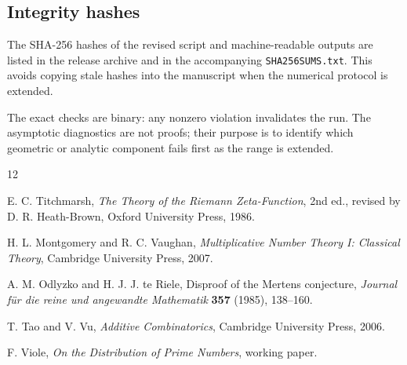 \documentclass[11pt]{article}
\theoremstyle{definition}
\newcommand{\1}{\mathbf{1}}
\begin{document}
\subsection{Integrity hashes}

The SHA-256 hashes of the revised script and machine-readable outputs are listed in the release archive and in the accompanying \texttt{SHA256SUMS.txt}.  This avoids copying stale hashes into the manuscript when the numerical protocol is extended.

The exact checks are binary: any nonzero violation invalidates the run. The asymptotic diagnostics are not proofs; their purpose is to identify which geometric or analytic component fails first as the range is extended.

\begin{thebibliography}{12}

E. C. Titchmarsh,
\emph{The Theory of the Riemann Zeta-Function},
2nd ed., revised by D. R. Heath-Brown,
Oxford University Press, 1986.

H. L. Montgomery and R. C. Vaughan,
\emph{Multiplicative Number Theory I: Classical Theory},
Cambridge University Press, 2007.

A. M. Odlyzko and H. J. J. te Riele,
Disproof of the Mertens conjecture,
\emph{Journal f\"ur die reine und angewandte Mathematik} \textbf{357} (1985), 138--160.

T. Tao and V. Vu,
\emph{Additive Combinatorics},
Cambridge University Press, 2006.

F. Viole,
\emph{On the Distribution of Prime Numbers},
working paper.


\end{thebibliography}
\end{document}
